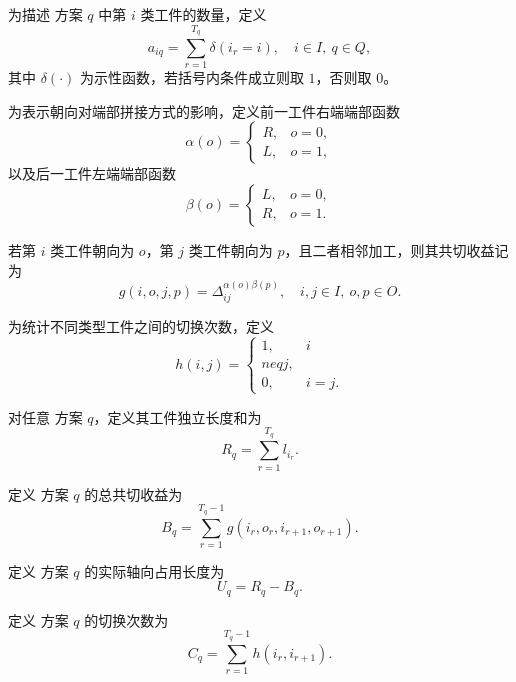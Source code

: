 \documentclass[UTF8]{ctexart}
\begin{document}
为描述 方案 $q$ 中第 $i$ 类工件的数量，定义
\begin{equation}
a_{iq}=\sum_{r=1}^{T_q}\delta(i_r=i),
\quad i\in I,\ q\in Q,
\label{eq:p4_aiq}
\end{equation}
其中 $\delta(\cdot)$ 为示性函数，若括号内条件成立则取 $1$，否则取 $0$。

为表示朝向对端部拼接方式的影响，定义前一工件右端端部函数
\begin{equation}
\alpha(o)=
\begin{cases}
R, & o=0,\\
L, & o=1,
\end{cases}
\label{eq:p4_alpha}
\end{equation}
以及后一工件左端端部函数
\begin{equation}
\beta(o)=
\begin{cases}
L, & o=0,\\
R, & o=1.
\end{cases}
\label{eq:p4_beta}
\end{equation}

若第 $i$ 类工件朝向为 $o$，第 $j$ 类工件朝向为 $p$，且二者相邻加工，则其共切收益记为
\begin{equation}
g(i,o,j,p)=\Delta_{ij}^{\alpha(o)\beta(p)},
\quad i,j\in I,\ o,p\in O.
\label{eq:p4_g}
\end{equation}

为统计不同类型工件之间的切换次数，定义
\begin{equation}
h(i,j)=
\begin{cases}
1, & i\\neq j,\\
0, & i=j.
\end{cases}
\label{eq:p4_h}
\end{equation}

对任意 方案 $q$，定义其工件独立长度和为
\begin{equation}
R_q=\sum_{r=1}^{T_q}l_{i_r}.
\label{eq:p4_Rq}
\end{equation}

定义 方案 $q$ 的总共切收益为
\begin{equation}
B_q=\sum_{r=1}^{T_q-1}g(i_r,o_r,i_{r+1},o_{r+1}).
\label{eq:p4_Bq}
\end{equation}

定义 方案 $q$ 的实际轴向占用长度为
\begin{equation}
U_q=R_q-B_q.
\label{eq:p4_Uq}
\end{equation}

定义 方案 $q$ 的切换次数为
\begin{equation}
C_q=\sum_{r=1}^{T_q-1}h(i_r,i_{r+1}).
\label{eq:p4_Cq}
\end{equation}
\end{document}
